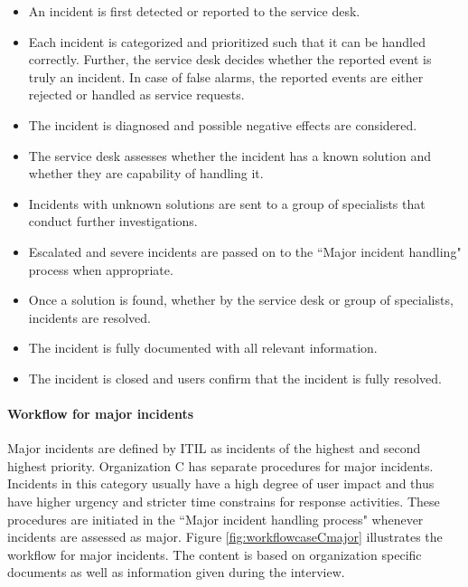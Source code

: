 \begin{itemize}\itemsep-0.1cm
\item An incident is first detected or reported to the service desk.
\item Each incident is categorized and prioritized such that it can be handled correctly. Further, the service desk decides whether the reported event is truly an incident. In case of false alarms, the reported events are either rejected or handled as service requests.
\item The incident is diagnosed and possible negative effects are considered.
\item The service desk assesses whether the incident has a known solution and whether they are capability of handling it.
\item Incidents with unknown solutions are sent to a group of specialists that conduct further investigations.
\item Escalated and severe incidents are passed on to the ``Major incident handling" process when appropriate. 
\item Once a solution is found, whether by the service desk or group of specialists, incidents are resolved.
\item The incident is fully documented with all relevant information.
\item The incident is closed and users confirm that the incident is fully resolved. 
\end{itemize}

\paragraph{Workflow for major incidents}
Major incidents are defined by ITIL as incidents of the highest and second highest priority. Organization C has separate procedures for major incidents. Incidents in this category usually have a high degree of user impact and thus have higher urgency and stricter time constrains for response activities. These procedures are initiated in the ``Major incident handling process" whenever incidents are assessed as major. Figure \ref{fig:workflowcaseCmajor} illustrates the workflow for major incidents. The content is based on organization specific documents as well as information given during the interview.

